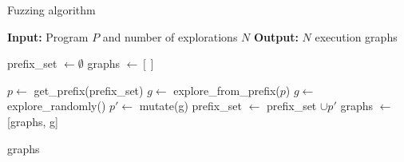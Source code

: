 \begin{algorithm}
    \caption{Fuzzing algorithm}
    \label{fuzzer}
    \begin{algorithmic}
    \STATE \textbf{Input:} Program $P$ and number of explorations $N$
    \STATE \textbf{Output:} $N$ execution graphs
    
    \STATE prefix\_set $\leftarrow \emptyset$
    \STATE graphs $\leftarrow [ ]$
    
            \STATE $p \leftarrow$ get\_prefix(prefix\_set)
            \STATE $g \leftarrow $ explore\_from\_prefix($p$)
        \ELSE 
            \STATE $g \leftarrow $ explore\_randomly()
        \ENDIF 
            \STATE $p' \leftarrow$ mutate(g)
            \STATE prefix\_set $\leftarrow$ prefix\_set $\cup p'$        
        \ENDIF
        \STATE graphs $\leftarrow$ [graphs, g]
    \ENDFOR
    
    \RETURN graphs
    \end{algorithmic}
\end{algorithm}










